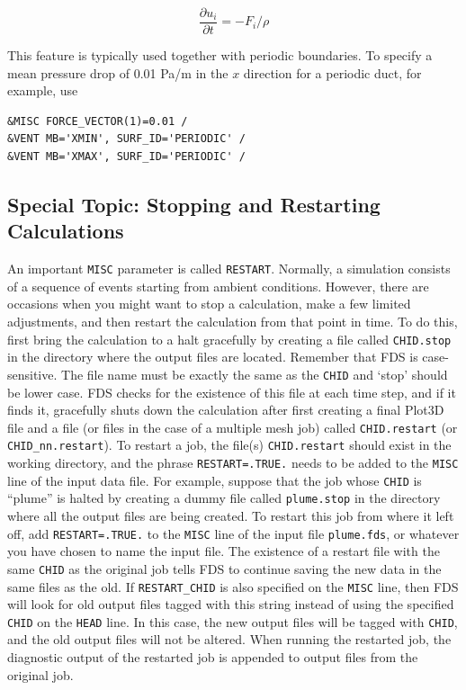 \documentclass[11pt]{book}
\newcommand{\ct}{\tt\small}
\begin{document}
\begin{equation}
\frac{\partial u_i}{\partial t} = -F_i/\rho
\end{equation}

\noindent This feature is typically used together with periodic boundaries.  To specify a mean pressure drop of 0.01 Pa/m in the $x$ direction for a periodic duct, for example, use

\footnotesize
\begin{verbatim}
&MISC FORCE_VECTOR(1)=0.01 /
&VENT MB='XMIN', SURF_ID='PERIODIC' /
&VENT MB='XMAX', SURF_ID='PERIODIC' /
\end{verbatim}
\normalsize

\subsection{Special Topic: Stopping and Restarting Calculations}
\label{info:restart}

An important {\ct MISC} parameter is called {\ct RESTART}. Normally, a simulation consists of a sequence of events
starting from ambient conditions. However, there are occasions
when you might want to stop a calculation, make a few
limited adjustments, and then
restart the calculation from that point in time. To do this,
first bring the calculation to a halt gracefully by creating a file
called {\ct CHID.stop}
in the directory where the output files are located. Remember that
FDS is case-sensitive. The file name must be exactly the same as
the {\ct CHID} and `stop' should be lower case. FDS checks for the
existence of this file at each time step, and if it finds it, gracefully
shuts down the calculation after first creating a final Plot3D
file and a file (or files in the case of a multiple mesh job)
called {\ct CHID.restart} (or {\ct CHID\_nn.restart}).
To restart a job, the file(s) {\ct CHID.restart} should exist in
the working directory, and
the phrase {\ct RESTART=.TRUE.} needs to be added
to the {\ct MISC} line of the input data file.
For example, suppose that the job
whose {\ct CHID} is ``plume'' is halted by creating a
dummy file called {\ct plume.stop} in the directory where
all the output files are being created. To restart this job from where it
left off, add {\ct RESTART=.TRUE.} to the {\ct MISC} line
of the input file {\ct plume.fds}, or whatever you have chosen to
name the input file. The existence of a restart file with the same
{\ct CHID} as the original job tells FDS
to continue saving the new data in the same files as the old.  If {\ct RESTART\_CHID} is also specified on the
{\ct MISC} line, then FDS will look for old output files tagged with this string instead of using the specified
{\ct CHID} on the {\ct HEAD} line. In this case, the new output files will be tagged with {\ct CHID}, and the
old output files will not be altered. When running the restarted job, the diagnostic output of the restarted job is appended to output files from the original job.
\end{document}
